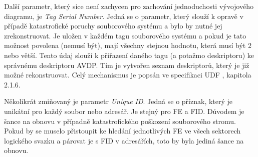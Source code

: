 Další parametr, který sice není zachycen pro zachování jednoduchosti vývojového diagramu, je \textit{Tag Serial Number}. Jedná se o parametr, který slouží k opravě v případě katastrofické poruchy souborového systému a bylo by nutné jej zrekonstruovat. Je uložen v každém tagu souborového systému a pokud je tato možnost povolena (nemusí být), mají všechny stejnou hodnotu, která musí být 2 nebo větší. Tento údaj slouží k přiřazení daného tagu (a potažmo deskriptoru) ke správnému deskriptoru AVDP. Tím je vytvořen seznam deskriptorů, který je již možné rekonstruovat. Celý mechanismus je popsán ve specifikaci UDF \cite{osta-udf-0201}, kapitola 2.1.6.

Několikrát zmiňovaný je parametr \textit{Unique ID}. Jedná se o příznak, který je unikátní pro každý soubor nebo adresář. Je stejný pro FE a FID. Důvodem je šance na obnovu v případně katastrofického poškození souborového stromu. Pokud by se muselo přistoupit ke hledání jednotlivých FE ve všech sektorech logického svazku a párovat je s FID v adresářích, toto by byla jediná šance na obnovu.

